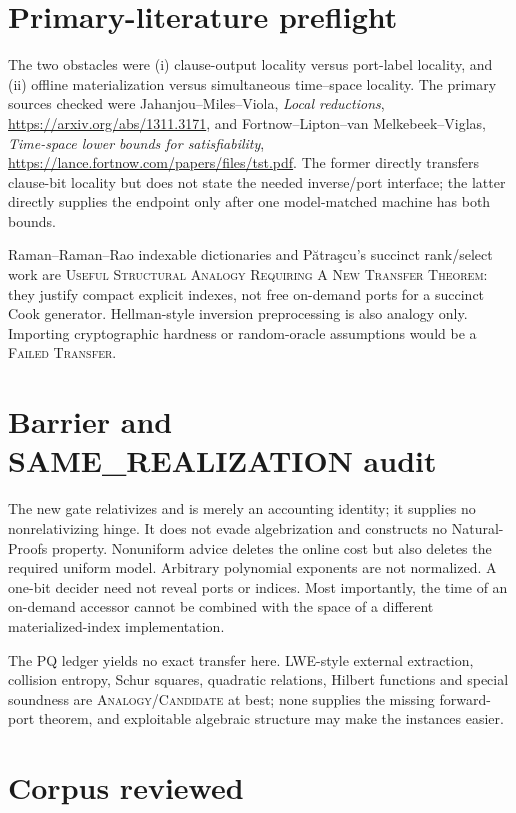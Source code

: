 \documentclass[11pt]{article}
\newcommand{\status}[1]{\textsc{#1}}
\begin{document}
\section{Primary-literature preflight}

The two obstacles were (i) clause-output locality versus port-label locality,
and (ii) offline materialization versus simultaneous time--space locality.
The primary sources checked were Jahanjou--Miles--Viola,
\emph{Local reductions}, \url{https://arxiv.org/abs/1311.3171}, and
Fortnow--Lipton--van Melkebeek--Viglas, \emph{Time-space lower bounds for
satisfiability}, \url{https://lance.fortnow.com/papers/files/tst.pdf}.
The former directly transfers clause-bit locality but does not state the
needed inverse/port interface; the latter directly supplies the endpoint only
after one model-matched machine has both bounds.

Raman--Raman--Rao indexable dictionaries and P\u{a}tra\c{s}cu's succinct
rank/select work are \status{Useful Structural Analogy Requiring A New
Transfer Theorem}: they justify compact explicit indexes, not free on-demand
ports for a succinct Cook generator.  Hellman-style inversion preprocessing
is also analogy only.  Importing cryptographic hardness or random-oracle
assumptions would be a \status{Failed Transfer}.

\section{Barrier and SAME\_REALIZATION audit}

The new gate relativizes and is merely an accounting identity; it supplies no
nonrelativizing hinge.  It does not evade algebrization and constructs no
Natural-Proofs property.  Nonuniform advice deletes the online cost but also
deletes the required uniform model.  Arbitrary polynomial exponents are not
normalized.  A one-bit decider need not reveal ports or indices.  Most
importantly, the time of an on-demand accessor cannot be combined with the
space of a different materialized-index implementation.

The PQ ledger yields no exact transfer here.  LWE-style external extraction,
collision entropy, Schur squares, quadratic relations, Hilbert functions and
special soundness are \status{Analogy/Candidate} at best; none supplies the
missing forward-port theorem, and exploitable algebraic structure may make
the instances easier.

\section{Corpus reviewed}
\end{document}
